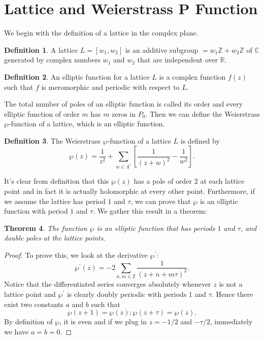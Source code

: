 \documentclass[psamsfonts]{amsart}
\newtheorem{theorem}{Theorem}[section]
\theoremstyle{definition}
\newtheorem{defn}[theorem]{Definition}
\theoremstyle{remark}
\numberwithin{equation}{section}
\begin{document}
	\section{Lattice and Weierstrass P Function}
		We begin with the definition of a lattice in the complex plane.
		\begin{defn}
			A lattice $L=[w_1,w_2]$ is an additive subgroup $= w_1 \mathbb{Z} + w_2 \mathbb{Z}$ of $\mathbb{C}$ generated by complex numbers $w_1$ and $w_2$ that are independent over $\mathbb{R}$.
		\end{defn}
		\begin{defn}
			An elliptic function for a lattice $L$ is a complex function $f(z)$ such that $f$ is meromorphic and periodic with respect to $L$.
		\end{defn}
		The total number of poles of an elliptic function is called its order and every elliptic function of order $m$ has $m$ zeros in $P_0$.
		Then we can define the Weierstrass $\wp$-function of a lattice, which is an elliptic function.
		\begin{defn}
			The Weierstrass $\wp$-function of a lattice $L$ is defined by 
			\begin{equation}
				\wp(z) = \frac{1}{z^2} + \sum_{w \in \Lambda^*} [\frac{1}{(z+w)^2} - \frac{1}{w^2}].
			\end{equation}
		\end{defn}
		It's clear from definition that this $\wp(z)$ has a pole of order $2$ at each lattice point and in fact it is actually holomorphic at every other point. Furthermore, if we assume the lattice has period $1$ and $\tau$, we can prove that $\wp$ is an elliptic function with period $1$ and $\tau$. We gather this result in a theorem:
		\begin{theorem}
			The function $\wp$ is an elliptic function that has periods $1$ and $\tau$, and double poles at the lattice points.
		\end{theorem}
		\begin{proof}
			To prove this, we look at the derivative $\wp^\prime$:
			\begin{equation}
				\wp^\prime(z) = -2 \sum_{n,m \in \mathbb{Z}}\frac{1}{(z+n+m\tau)^3}.
			\end{equation}
			Notice that the differentiated series converges absolutely whenever $z$ is not a lattice point and $\wp^\prime$ is clearly doubly periodic with periods $1$ and $\tau$. Hence there exist two constants $a$ and $b$ such that
			\begin{equation}
				\wp(z+1) = \wp(z); \wp(z+\tau) = \wp(z).
			\end{equation}
			By definition of $\wp$, it is even and if we plug in $z = -1/2$ and $-\tau/2$, immediately we have $a=b=0$.
		\end{proof}
		
\end{document}
